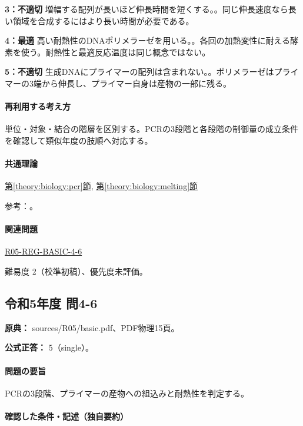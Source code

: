 \noindent\textbf{3：不適切} 増幅する配列が長いほど伸長時間を短くする。。同じ伸長速度なら長い領域を合成するにはより長い時間が必要である。\par

\noindent\textbf{4：最適} 高い耐熱性のDNAポリメラーゼを用いる。。各回の加熱変性に耐える酵素を使う。耐熱性と最適反応温度は同じ概念ではない。\par

\noindent\textbf{5：不適切} 生成DNAにプライマーの配列は含まれない。。ポリメラーゼはプライマーの3端から伸長し、プライマー自身は産物の一部に残る。\par

\paragraph{再利用する考え方} 単位・対象・結合の階層を区別する。PCRの3段階と各段階の制御量の成立条件を確認して類似年度の肢順へ対応する。

\paragraph{共通理論} \hyperref[theory:biology:pcr]{第\ref*{theory:biology:pcr}節}, \hyperref[theory:biology:melting]{第\ref*{theory:biology:melting}節}

\par 参考：\cite{neb_pcr}。

\paragraph{関連問題} \hyperref[q:r05-reg-basic-4-6]{R05-REG-BASIC-4-6}

\par 難易度 2（校準初稿）、優先度未評価。

\subsection{令和5年度 問4-6}
\label{q:r05-reg-basic-4-6}

\noindent\textbf{原典：} sources/R05/basic.pdf、PDF物理15頁。

\textbf{公式正答：} 5（single）。

\paragraph{問題の要旨} PCRの3段階、プライマーの産物への組込みと耐熱性を判定する。

\paragraph{確認した条件・記述（独自要約）}\mbox{}\par

